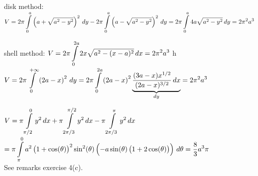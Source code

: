\begin{Answer}
    disk method:	$V = 2\pi \displaystyle \int\limits_{0}^{a} \left(a + \sqrt{a^2 - y^2}  \right)^2 \, dy - 2\pi \displaystyle \int\limits_{0}^{a} \left(a - \sqrt{a^2 - y^2}  \right)^2 \, dy = 2\pi \displaystyle \int\limits_{0}^{a} 4a \sqrt{a^2 - y^2}  \, dy =  2 \pi^2 a^3$
    
    shell method:	$V = 2\pi \displaystyle \int\limits_{0}^{2a} 2x \sqrt{a^2 - (x-a)^2} \, dx = 2 \pi^2 a^3$
     h   \Question $V = 2\pi \displaystyle \int\limits_{0}^{+\infty} \left( 2a-x \right)^2 \, dy = 2\pi \displaystyle \int\limits_{0}^{2a} \left( 2a-x \right)^2 \underbrace{\dfrac{(3a-x)x^{1/2}}{(2a-x)^{3/2}} \, dx}_{dy} =  2\pi^2a^3$
    
        
    \Question  $V = \pi \displaystyle \int\limits_{\pi/2}^{0} y^2 \, dx + \pi \displaystyle \int\limits_{2\pi/3}^{\pi/2} y^2 \, dx - \pi \displaystyle \int\limits_{2\pi/3}^{\pi} y^2 \, dx $ \\[0.2cm]
        $=\pi \displaystyle \int\limits_{\pi}^{0} a^2\left( 1 + \cos(\theta) \right)^2 \sin^2(\theta)\left(-a \sin(\theta) \left(1+2\cos(\theta) \right)\right) \, d\theta = \dfrac{8}{3}a^3 \pi$ \\[0.2cm]
        See remarks exercise 4(c).
    \fi

\end{Answer}
\ifcalculus \pagebreak \fi
